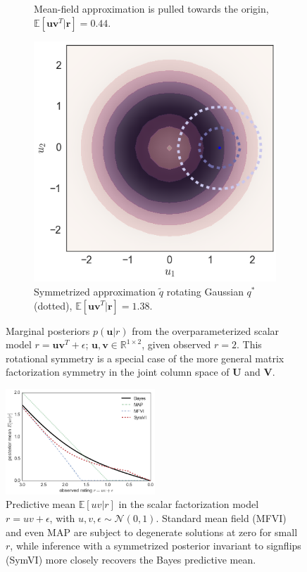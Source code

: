 \documentclass{article}
\newcommand{\N}{\mathcal{N}}
\newcommand{\E}{\mathbb{E}}
\renewcommand{\v}[1]{\mathbf{#1}}
\begin{document}
\begin{figure}[t]
\begin{subfigure}[t]{.3\textwidth}
\caption{Mean-field approximation is pulled towards the
  origin, $\E[\v{u}\v{v}^T|\v{r}] = 0.44$.}
\end{subfigure}
\begin{subfigure}[t]{.3\textwidth}
\includegraphics[width=\textwidth]{rot_symmetric_posterior}
\caption{Symmetrized approximation $\tilde{q}$ rotating
  Gaussian $q^*$ (dotted),  $\E[\v{u}\v{v}^T|\v{r}] = 1.38$.}
\end{subfigure}
\caption{Marginal posteriors $p(\v{u} | r)$ from the
  overparameterized scalar model $r = \v{u}\v{v}^T + \epsilon$;
  $\v{u},\v{v} \in \mathbb{R}^{1 \times 2}$, given observed
  $r=2$. This rotational symmetry is a special case of the more general
  matrix factorization symmetry in the joint column space of $\v{U}$ and $\v{V}$.}
\label{fig:rot_demo}
\vspace{-1.3em}
\end{figure}

\begin{figure}
\centering
\includegraphics[width=0.5\textwidth]{signflip_sv_plot}
\caption{Predictive mean $\E[uv | r]$ in the scalar factorization model $r = uv + \epsilon$, with $u,
  v, \epsilon \sim \N(0, 1)$. Standard mean field (MFVI)
  and even MAP are subject to degenerate solutions at zero for small $r$, while
  inference with a symmetrized posterior invariant to signflips (SymVI)
  more closely recovers the Bayes predictive mean.}
\label{fig:signflip_svs}
\end{figure}
\end{document}
